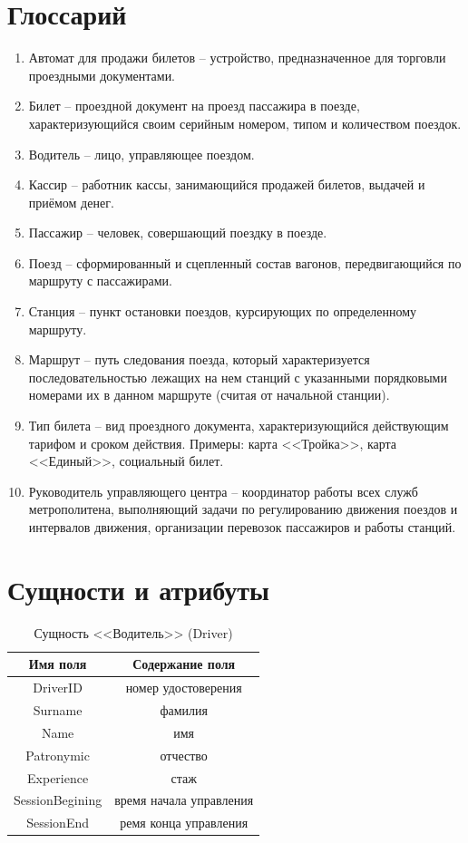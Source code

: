 \documentclass[a4paper,10pt]{article}
\theoremstyle{plain} %
\theoremstyle{definition} %
\theoremstyle{remark} %
\theoremstyle{definition}
\begin{document}
\newpage
\section{Глоссарий}
\begin{enumerate}
    \item Автомат для продажи билетов -- устройство, предназначенное для торговли проездными документами.
    \item Билет -- проездной документ на проезд пассажира в поезде, характеризующийся своим серийным номером, типом и количеством поездок.
    \item Водитель -- лицо, управляющее поездом.
    \item Кассир -- работник кассы, занимающийся продажей билетов, выдачей и приёмом денег.
    \item Пассажир -- человек, совершающий поездку в поезде.
    \item Поезд -- сформированный и сцепленный состав вагонов, передвигающийся по маршруту с пассажирами.
    \item Станция -- пункт остановки поездов, курсирующих по определенному маршруту. 
    \item Маршрут -- путь следования поезда, который характеризуется последовательностью лежащих на нем станций с указанными порядковыми номерами их в данном маршруте (считая от начальной станции).
    \item Тип билета -- вид проездного документа, характеризующийся действующим тарифом и сроком действия. Примеры: карта <<Тройка>>, карта <<Единый>>, социальный билет.
    \item Руководитель управляющего центра -- координатор работы всех служб метрополитена, выполняющий задачи по регулированию движения поездов и интервалов движения, организации перевозок пассажиров и работы станций.
\end{enumerate}





\newpage
\section{Сущности и атрибуты}
\begin{table}[h!]
\centering
\begin{tabular}{|c|c|}
    \hline
    Имя поля & Содержание поля \\
    \hline
    DriverID & номер удостоверения \\
    Surname & фамилия \\
    Name & имя  \\
    Patronymic & отчество\\
    Experience & стаж \\
    SessionBegining & время начала управления \\
    SessionEnd & ремя конца управления \\
    \hline
\end{tabular}
    \caption{Сущность <<Водитель>> (Driver)}
\end{table}
\end{document}
